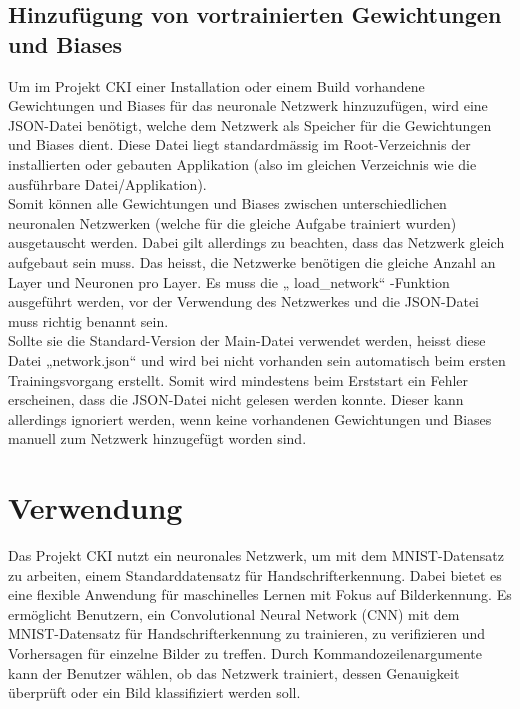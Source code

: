 \subsection{Hinzufügung von vortrainierten Gewichtungen und Biases}
\label{sec:InstallHinzufügungVonVortrainiertenGewichtungenUndBiases}
Um im Projekt CKI einer Installation oder einem Build vorhandene Gewichtungen und Biases für das neuronale Netzwerk hinzuzufügen, wird eine JSON-Datei benötigt, welche dem Netzwerk als Speicher für die Gewichtungen und Biases dient. Diese Datei liegt standardmässig im Root-Verzeichnis der installierten oder gebauten Applikation (also im gleichen Verzeichnis wie die ausführbare Datei/Applikation).
\\
Somit können alle Gewichtungen und Biases zwischen unterschiedlichen neuronalen Netzwerken (welche für die gleiche Aufgabe trainiert wurden) ausgetauscht werden. Dabei gilt allerdings zu beachten, dass das Netzwerk gleich aufgebaut sein muss. Das heisst, die Netzwerke benötigen die gleiche Anzahl an Layer und Neuronen pro Layer. Es muss die „ load\_network“ -Funktion ausgeführt werden, vor der Verwendung des Netzwerkes und die JSON-Datei muss richtig benannt sein.
\\
Sollte sie die Standard-Version der Main-Datei verwendet werden, heisst diese Datei „network.json“ und wird bei nicht vorhanden sein automatisch beim ersten Trainingsvorgang erstellt. Somit wird mindestens beim Erststart ein Fehler erscheinen, dass die JSON-Datei nicht gelesen werden konnte. Dieser kann allerdings ignoriert werden, wenn keine vorhandenen Gewichtungen und Biases manuell zum Netzwerk hinzugefügt worden sind.

\section{Verwendung}
Das Projekt CKI nutzt ein neuronales Netzwerk, um mit dem MNIST-Datensatz zu arbeiten, einem Standarddatensatz für Handschrifterkennung. Dabei bietet es eine flexible Anwendung für maschinelles Lernen mit Fokus auf Bilderkennung. Es ermöglicht Benutzern, ein Convolutional Neural Network (CNN) mit dem MNIST-Datensatz für Handschrifterkennung zu trainieren, zu verifizieren und Vorhersagen für einzelne Bilder zu treffen. Durch Kommandozeilenargumente kann der Benutzer wählen, ob das Netzwerk trainiert, dessen Genauigkeit überprüft oder ein Bild klassifiziert werden soll. 
